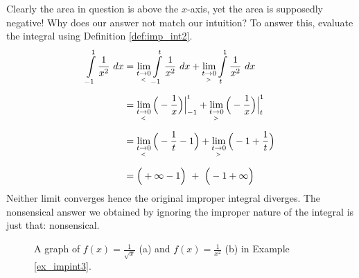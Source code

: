 \begin{example}
\begin{enumerate}
Clearly the area in question is above the $x$-axis, yet the area is supposedly negative! Why does our answer not match our intuition? To answer this, evaluate the integral using Definition \ref{def:imp_int2}.
\begin{align*}
\ds \int\limits_{-1}^1\frac1{x^2}\ dx &= \lim_{t\underset{<}{\rightarrow}0}\ds \int\limits_{-1}^t \frac1{x^2}\ dx + \lim_{t\underset{>}{\rightarrow}0}\ds \int\limits_t^1\frac1{x^2}\ dx \\[0.2cm]
			&= \lim_{t\underset{<}{\rightarrow}0}\Big(-\frac1x\Big)\Big|_{-1}^t + \lim_{t\underset{>}{\rightarrow}0}\Big(-\frac1x\Big)\Big|_t^1\\[0.2cm]
			&= \lim_{t\underset{<}{\rightarrow}0}\Big(-\frac1t-1\Big) + \lim_{t\underset{>}{\rightarrow}0} \Big(-1+\frac1t\Big)\\[0.2cm]
			&= \Big(+\infty-1\Big)\ + \ \Big(- 1+\infty\Big)
\end{align*}
Neither limit converges hence the original improper integral diverges. The nonsensical answer we obtained by ignoring the improper nature of the integral is just that: nonsensical.

\end{enumerate}
\begin{figure}[H]
\centering
\qquad
{}
\caption{A graph of $f(x)=\frac{1}{\sqrt{x}}$ (a) and $f(x)=\frac{1}{x^2}$ (b)  in Example \ref{ex_impint3}.}
\end{figure} 

\end{example}

